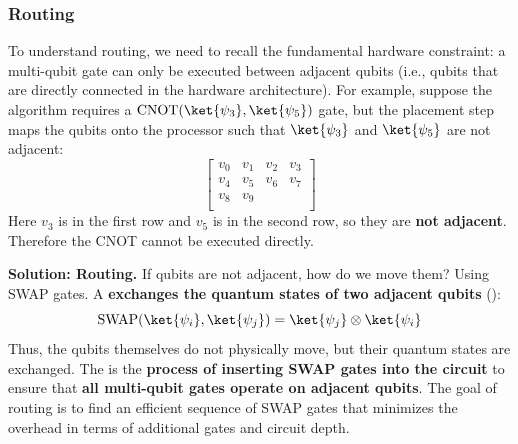 \subsubsection{Routing}\label{sec:routing}

To understand routing, we need to recall the fundamental hardware constraint: a multi-qubit gate can only be executed between adjacent qubits (i.e., qubits that are directly connected in the hardware architecture). For example, suppose the algorithm requires a $\text{CNOT}(\ket{\psi_{3}}, \ket{\psi_{5}})$ gate, but the placement step maps the qubits onto the processor such that $\ket{\psi_{3}}$ and $\ket{\psi_{5}}$ are not adjacent:
\begin{equation*}
    \begin{bmatrix}
        v_0 & v_1 & v_2 & v_3 \\
        v_4 & v_5 & v_6 & v_7 \\
        v_8 & v_9 &     &     \\
    \end{bmatrix}
\end{equation*}
Here $v_3$ is in the first row and $v_5$ is in the second row, so they are \textbf{not adjacent}. Therefore the CNOT cannot be executed directly.

\highspace
\textcolor{Green3}{ \textbf{Solution: Routing.}} If qubits are not adjacent, how do we move them? Using SWAP gates. A  \textbf{exchanges the quantum states of two adjacent qubits} ():
\begin{equation*}
    \text{SWAP}(\ket{\psi_{i}}, \ket{\psi_{j}}) = \ket{\psi_{j}} \otimes \ket{\psi_{i}}
\end{equation*}
Thus, the qubits themselves do not physically move, but their quantum states are exchanged. The  is the \textbf{process of inserting SWAP gates into the circuit} to ensure that \textbf{all multi-qubit gates operate on adjacent qubits}. The goal of routing is to find an efficient sequence of SWAP gates that minimizes the overhead in terms of additional gates and circuit depth.

